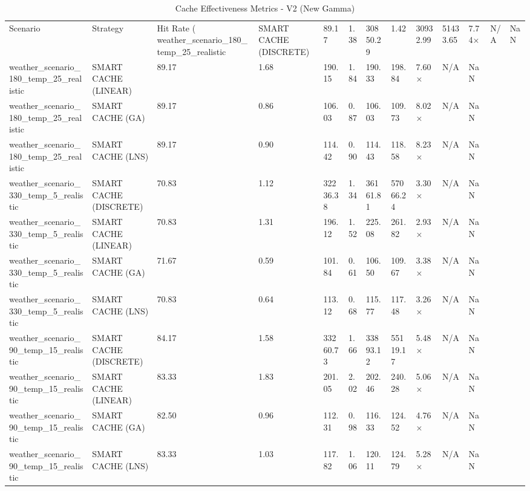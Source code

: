 \begin{table}
\caption{Cache Effectiveness Metrics - V2 (New Gamma)}
\label{tab:cache_metrics}
\begin{tabular}{lllllllllll}
\toprule
Scenario & Strategy & Hit Rate (%
\midrule
weather_scenario_180_temp_25_realistic & SMART CACHE (DISCRETE) & 89.17 & 1.38 & 30850.29 & 1.42 & 30932.99 & 51433.65 & 7.74× & N/A & NaN \\
weather_scenario_180_temp_25_realistic & SMART CACHE (LINEAR) & 89.17 & 1.68 & 190.15 & 1.84 & 190.33 & 198.84 & 7.60× & N/A & NaN \\
weather_scenario_180_temp_25_realistic & SMART CACHE (GA) & 89.17 & 0.86 & 106.03 & 0.87 & 106.03 & 109.73 & 8.02× & N/A & NaN \\
weather_scenario_180_temp_25_realistic & SMART CACHE (LNS) & 89.17 & 0.90 & 114.42 & 0.90 & 114.43 & 118.58 & 8.23× & N/A & NaN \\
weather_scenario_330_temp_5_realistic & SMART CACHE (DISCRETE) & 70.83 & 1.12 & 32236.38 & 1.34 & 36161.81 & 57066.24 & 3.30× & N/A & NaN \\
weather_scenario_330_temp_5_realistic & SMART CACHE (LINEAR) & 70.83 & 1.31 & 196.12 & 1.52 & 225.08 & 261.82 & 2.93× & N/A & NaN \\
weather_scenario_330_temp_5_realistic & SMART CACHE (GA) & 71.67 & 0.59 & 101.84 & 0.61 & 106.50 & 109.67 & 3.38× & N/A & NaN \\
weather_scenario_330_temp_5_realistic & SMART CACHE (LNS) & 70.83 & 0.64 & 113.12 & 0.68 & 115.77 & 117.48 & 3.26× & N/A & NaN \\
weather_scenario_90_temp_15_realistic & SMART CACHE (DISCRETE) & 84.17 & 1.58 & 33260.73 & 1.66 & 33893.12 & 55119.17 & 5.48× & N/A & NaN \\
weather_scenario_90_temp_15_realistic & SMART CACHE (LINEAR) & 83.33 & 1.83 & 201.05 & 2.02 & 202.46 & 240.28 & 5.06× & N/A & NaN \\
weather_scenario_90_temp_15_realistic & SMART CACHE (GA) & 82.50 & 0.96 & 112.31 & 0.98 & 116.33 & 124.52 & 4.76× & N/A & NaN \\
weather_scenario_90_temp_15_realistic & SMART CACHE (LNS) & 83.33 & 1.03 & 117.82 & 1.06 & 120.11 & 124.79 & 5.28× & N/A & NaN \\
\bottomrule
\end{tabular}
\end{table}
